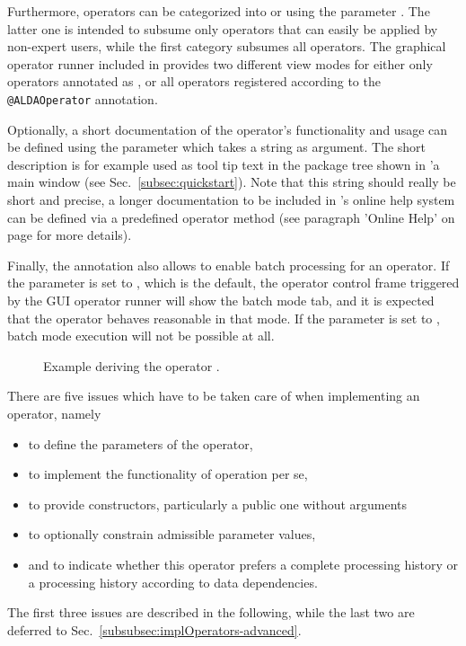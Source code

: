 Furthermore, operators can be categorized into 
or  using the parameter .
The latter one is intended to subsume only operators that can easily be applied by non-expert users,
while the first category subsumes all operators. The graphical operator runner included in \alida 
provides two different view modes for either only operators annotated as
, or all operators registered according to the
\texttt{@ALDAOperator} annotation.

Optionally, a short documentation of the operator's functionality and usage can be
defined using the parameter  which takes a string as argument.
The short description is for example used as tool tip text in the package tree shown in \alida'a main window
(see Sec.~\ref{subsec:quickstart}). Note that this string should really be short and precise,
a longer documentation to be included in \alida's online help system can be defined via a
predefined operator method (see paragraph 'Online Help' on page \pageref{para:online-help} for more details). 

Finally, the annotation also allows to enable batch
processing for an operator. If the parameter  is set to ,
which is the default, the operator control frame triggered by the GUI operator
runner will show the batch mode tab, and it is expected that the operator
behaves reasonable in that mode. If the parameter is set to
, batch mode execution will not be possible at all.

\begin{figure}[h]

\caption{\label{exa:defineOp}Example deriving the operator .}
\end{figure}

There are five issues which have to be taken care of when implementing
an operator, namely
\begin{itemize}
\item	to define the parameters of the operator,
\item	to implement the functionality of operation per se,
\item 	to provide constructors, particularly a public one without arguments
\item	to optionally constrain admissible parameter values,
\item 	and to indicate whether
          this operator prefers a complete processing history
	or a processing history according to data dependencies.
\end{itemize}
The first three issues
are described in the following,
while the last two are deferred to Sec.~\ref{subsubsec:implOperators-advanced}.

